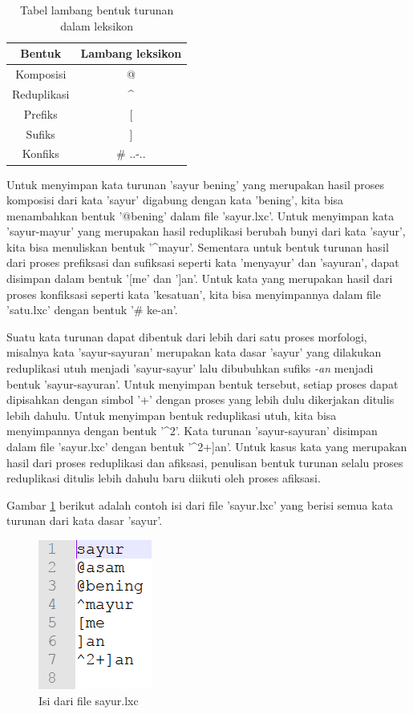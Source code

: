 \begin{table}[H]
\centering
\begin{tabular}{|c|c|}
\hline
\textbf{Bentuk} & \textbf{Lambang leksikon} \\
\hline
Komposisi&@\\
Reduplikasi&\textasciicircum\\
Prefiks&[\\
Sufiks&]\\
Konfiks&\# ..-..\\
\hline
\end{tabular}
\caption{Tabel lambang bentuk turunan dalam leksikon} 
\label{tabel-lambang-leksikon}
\end{table}

Untuk menyimpan kata turunan 'sayur bening' yang merupakan hasil proses komposisi dari kata 'sayur' digabung dengan kata 'bening', kita bisa menambahkan bentuk '@bening' dalam file 'sayur.lxc'. Untuk menyimpan kata 'sayur-mayur' yang merupakan hasil reduplikasi berubah bunyi dari kata 'sayur', kita bisa menuliskan bentuk '\textasciicircum mayur'. Sementara untuk bentuk turunan hasil dari proses prefiksasi dan sufiksasi seperti kata 'menyayur' dan 'sayuran', dapat disimpan dalam bentuk '[me' dan ']an'. Untuk kata yang merupakan hasil dari proses konfiksasi seperti kata 'kesatuan', kita bisa menyimpannya dalam file 'satu.lxc' dengan bentuk '\# ke-an'.

Suatu kata turunan dapat dibentuk dari lebih dari satu proses morfologi, misalnya kata 'sayur-sayuran' merupakan kata dasar 'sayur' yang dilakukan reduplikasi utuh menjadi 'sayur-sayur' lalu dibubuhkan sufiks \textit{-an} menjadi bentuk 'sayur-sayuran'. Untuk menyimpan bentuk tersebut, setiap proses dapat dipisahkan dengan simbol '+' dengan proses yang lebih dulu dikerjakan ditulis lebih dahulu. Untuk menyimpan bentuk reduplikasi utuh, kita bisa menyimpannya dengan bentuk '\textasciicircum 2'. Kata turunan 'sayur-sayuran' disimpan dalam file 'sayur.lxc' dengan bentuk '\textasciicircum 2+]an'. Untuk kasus kata yang merupakan hasil dari proses reduplikasi dan afiksasi, penulisan bentuk turunan selalu proses reduplikasi ditulis lebih dahulu baru diikuti oleh proses afiksasi. 

Gambar \ref{contoh-entri-sayur} berikut adalah contoh isi dari file 'sayur.lxc' yang berisi semua kata turunan dari kata dasar 'sayur'.

\begin{figure}[H]
\centering
\includegraphics[scale=1]{Gambar/contoh-entri-sayur}
\caption{Isi dari file sayur.lxc} 
\label{contoh-entri-sayur}
\end{figure}

